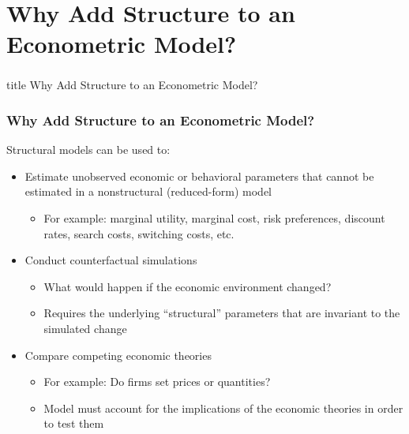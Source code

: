 \documentclass{beamer}
\begin{document}
\section{Why Add Structure to an Econometric Model?}
\label{why}
\begin{frame}\frametitle{}
    \vfill
    \centering
    \begin{beamercolorbox}[center]{title}
        \Large Why Add Structure to an Econometric Model?
    \end{beamercolorbox}
    \vfill
\end{frame}

\begin{frame}\frametitle{Why Add Structure to an Econometric Model?}
	Structural models can be used to:
	\begin{itemize}
		\item Estimate unobserved economic or behavioral parameters that cannot be estimated in a nonstructural (reduced-form) model
		\begin{itemize}
			\item For example: marginal utility, marginal cost, risk preferences, discount rates, search costs, switching costs, etc.
		\end{itemize}
		\item Conduct counterfactual simulations
		\begin{itemize}
			\item What would happen if the economic environment changed?
			\item Requires the underlying ``structural'' parameters that are invariant to the simulated change
		\end{itemize}
		\item Compare competing economic theories
		\begin{itemize}
			\item For example: Do firms set prices or quantities?
			\item Model must account for the implications of the economic theories in order to test them
		\end{itemize}
	\end{itemize}
\end{frame}
\end{document}
